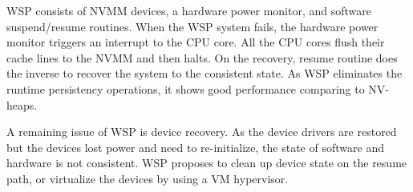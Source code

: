 WSP consists of NVMM devices, a hardware power monitor, and software suspend/resume routines. When the WSP system fails, the hardware power monitor triggers
an interrupt to the CPU core. All the CPU cores flush their cache lines to the 
NVMM and then halts. On the recovery, resume routine does the inverse to recover
the system to the consistent state. As WSP eliminates the runtime persistency
operations, it shows good performance comparing to NV-heaps.

A remaining issue of WSP is device recovery. As the device drivers are restored
but the devices lost power and need to re-initialize, the state of software
and hardware is not consistent. WSP proposes to clean up device state on
the resume path, or virtualize the devices by using a VM hypervisor.


